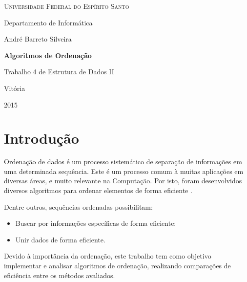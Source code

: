 \documentclass[
	11pt,
	oneside,
	a4paper,
	english,
	brazil,
	]{article}
\begin{document}

\begin{titlepage}
	\centering
	{\scshape \large Universidade Federal do Espírito Santo\par}
	{\large Departamento de Informática\par}
	\vspace{1cm}
	{\large André Barreto Silveira\par}
	
	\vfill
	{\LARGE \bfseries Algoritmos de Ordenação\par}
	\vspace{1cm}
	{\large Trabalho 4 de Estrutura de Dados II\par}

	\vfill

	{\large Vitória\par}
	{\large 2015\par}
	\thispagestyle{empty}
\end{titlepage}

\clearpage
\setcounter{page}{2}

\section{Introdução}
Ordenação de dados é um processo sistemático de separação de informações em 
uma determinada sequência. Este é um processo comum à muitas aplicações em
diversas áreas, e muito relevante na Computação. Por isto, foram
desenvolvidos diversos algoritmos para ordenar elementos de forma 
eficiente \cite{sorting}.

Dentre outros, sequências ordenadas possibilitam:
\begin{itemize}
 \item Buscar por informações específicas de forma eficiente;
 \item Unir dados de forma eficiente.
\end{itemize}

Devido à importância da ordenação, este trabalho tem como objetivo implementar
e analisar algoritmos de ordenação, realizando comparações de eficiência entre
os métodos avaliados.

\end{document}
